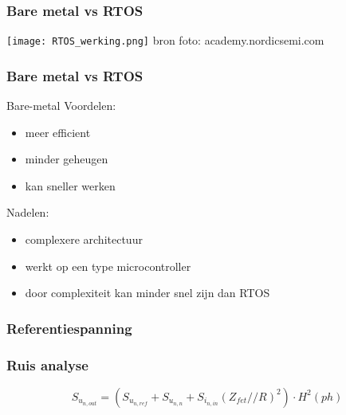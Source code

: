 \begin{frame}
    \frametitle{Bare metal vs RTOS}
    \texttt{[image: RTOS\_werking.png]}
    bron foto: academy.nordicsemi.com
\end{frame}

\begin{frame}
    \frametitle{Bare metal vs RTOS}
    Bare-metal
    Voordelen:
    \begin{itemize}
        \item meer efficient
        \item minder geheugen
        \item kan sneller werken
    \end{itemize}
    \vspace{0.5cm}
    Nadelen:
    \begin{itemize}
        \item complexere architectuur
        \item werkt op een type microcontroller
        \item door complexiteit kan minder snel zijn dan RTOS
    \end{itemize}
\end{frame}


\begin{frame}
    \frametitle{Referentiespanning}
    


\end{frame}


\begin{frame}
    \frametitle{Ruis analyse}

    \begin{figure}
        \centering
        \def\svgwidth{0.7\textwidth}
        
    \end{figure}
    \begin{equation*}\label{eq:measureNoiseOut}
        S_{u_{{n,out}}} = \left(S_{u_{{n,ref}}} + S_{u_{{n,n}}} + S_{i_{{n,in}}}\left(Z_{fet} // R\right)^2\right) \cdot H^2(ph)
    \end{equation*}

\end{frame}

